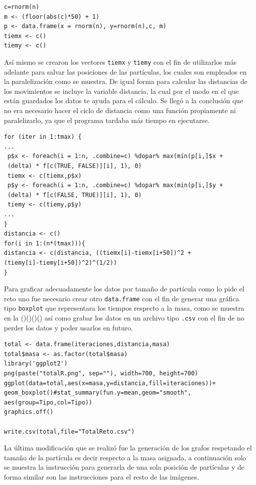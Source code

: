 \documentclass[a4paper]{article}
\begin{document}
\begin{lstlisting}[frame=single]
c=rnorm(n)
m <- (floor(abs(c)*50) + 1)
p <- data.frame(x = rnorm(n), y=rnorm(n),c, m)
tiemx <- c()
tiemy <- c()
\end{lstlisting}

Así mismo se crearon los vectores \texttt{tiemx} y \texttt{tiemy} con el fin de utilizarlos más adelante para salvar las posiciones de las partículas, los cuales son empleados en la paralelización como se muestra. De igual forma para calcular las distancias de los movimientos se incluye la variable distancia, la cual por el modo en el que están guardados los datos te ayuda para el cálculo. Se llegó a la conclusión que no era necesario hacer el ciclo de distancia como una función propiamente ni paralelizarlo, ya que el programa tardaba más tiempo en ejecutarse.

\begin{lstlisting}[frame=single]
for (iter in 1:tmax) {
...
 p$x <- foreach(i = 1:n, .combine=c) %dopar% max(min(p[i,]$x + 
 (delta) * f[c(TRUE, FALSE)][i], 1), 0)
 tiemx <- c(tiemx,p$x)
 p$y <- foreach(i = 1:n, .combine=c) %dopar% max(min(p[i,]$y + 
 (delta) * f[c(FALSE, TRUE)][i], 1), 0)
 tiemy <- c(tiemy,p$y)
...
}
distancia <- c()
for(i in 1:(n*(tmax))){
distancia <- c(distancia, ((tiemx[i]-tiemx[i+50])^2 + 
(tiemy[i]-tiemy[i+50])^2)^(1/2))
}
\end{lstlisting}
Para graficar adecuadamente los datos por tamaño de partícula como lo pide el reto uno fue necesario crear otro \texttt{data.frame} con el fin de generar una gráfica tipo \texttt{boxplot} que representara los tiempos respecto a la masa, como se muestra en la ()()()() así como grabar los datos en un archivo tipo \texttt{.csv} con el fin de no perder los datos y poder usarlos en futuro.

\begin{lstlisting}[frame=single]
total <- data.frame(iteraciones,distancia,masa)
total$masa <- as.factor(total$masa)
library('ggplot2')
png(paste("totalR.png", sep=""), width=700, height=700)
ggplot(data=total,aes(x=masa,y=distancia,fill=iteraciones))+
geom_boxplot()#stat_summary(fun.y=mean,geom="smooth",
aes(group=Tipo,col=Tipo))
graphics.off()

write.csv(total,file="TotalReto.csv")
\end{lstlisting}
La última modificación que se realizó fue la generación de los grafos respetando el tamaño de la partícula es decir respecto a la masa asignada, a continuación solo se muestra la instrucción para generarla de una sola posición de partículas y de forma similar son las instrucciones para el resto de las imágenes.
\end{document}

